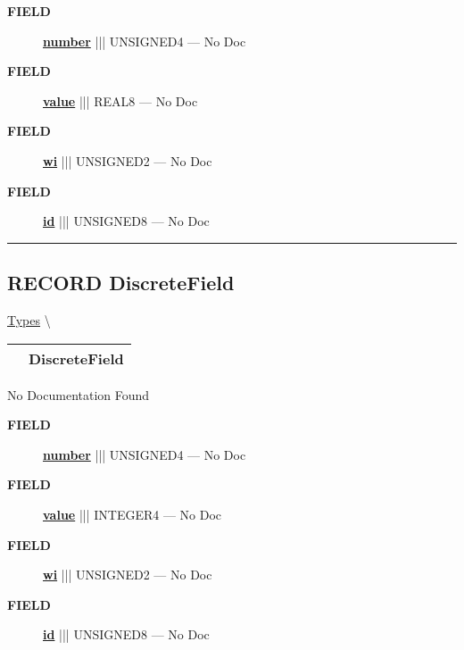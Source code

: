 \par
\begin{description}
\item [\colorbox{tagtype}{\color{white} \textbf{\textsf{FIELD}}}] \textbf{\underline{number}} ||| UNSIGNED4 --- No Doc
\item [\colorbox{tagtype}{\color{white} \textbf{\textsf{FIELD}}}] \textbf{\underline{value}} ||| REAL8 --- No Doc
\item [\colorbox{tagtype}{\color{white} \textbf{\textsf{FIELD}}}] \textbf{\underline{wi}} ||| UNSIGNED2 --- No Doc
\item [\colorbox{tagtype}{\color{white} \textbf{\textsf{FIELD}}}] \textbf{\underline{id}} ||| UNSIGNED8 --- No Doc
\end{description}





\rule{\linewidth}{0.5pt}
\subsection*{\textsf{\colorbox{headtoc}{\color{white} RECORD}
DiscreteField}}

\hypertarget{ecldoc:ml_core.types.discretefield}{}
\hspace{0pt} \hyperlink{ecldoc:ML_Core.Types}{Types} \textbackslash 

{\renewcommand{\arraystretch}{1.5}
\begin{tabularx}{\textwidth}{|>{\raggedright\arraybackslash}l|X|}
\hline
\hspace{0pt}\mytexttt{\color{red} } & \textbf{DiscreteField} \\
\hline
\end{tabularx}
}

\par





No Documentation Found







\par
\begin{description}
\item [\colorbox{tagtype}{\color{white} \textbf{\textsf{FIELD}}}] \textbf{\underline{number}} ||| UNSIGNED4 --- No Doc
\item [\colorbox{tagtype}{\color{white} \textbf{\textsf{FIELD}}}] \textbf{\underline{value}} ||| INTEGER4 --- No Doc
\item [\colorbox{tagtype}{\color{white} \textbf{\textsf{FIELD}}}] \textbf{\underline{wi}} ||| UNSIGNED2 --- No Doc
\item [\colorbox{tagtype}{\color{white} \textbf{\textsf{FIELD}}}] \textbf{\underline{id}} ||| UNSIGNED8 --- No Doc
\end{description}





